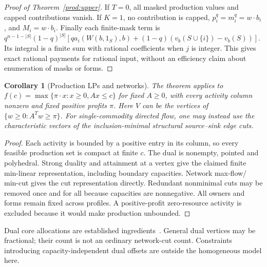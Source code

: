 \documentclass[11pt]{article}
\newtheorem{corollary}[theorem]{Corollary}
\theoremstyle{definition}\newtheorem{definition}[theorem]{Definition}
\theoremstyle{remark}\newtheorem{remark}[theorem]{Remark}
\begin{document}
\begin{proof}[Proof of Theorem~\ref{prod:upper}]
If $T=0$, all masked production values and capped contributions vanish.
If $K=1$, no contribution is capped, $p_i^q=m_i^q=w\cdot b_i$, and
$M_i=w\cdot b_i$. Finally each finite-mask term is
$q^{n-1-|S|}(1-q)^{|S|}[q a_i(W(b,1_S),b)+(1-q)(v_b(S\cup\{i\})-v_b(S))]$.
Its integral is a finite sum with rational coefficients when $j$ is integer.
This gives exact rational payments for rational input, without an efficiency
claim about enumeration of masks or forms.
\end{proof}

\begin{corollary}[Production LPs and networks]\label{prod:lp}
The theorem applies to
$f(c)=\max\{\pi\cdot x:x\ge0,Ax\le c\}$ for fixed $A\ge0$, with every
activity column nonzero and fixed positive profits $\pi$. Here $V$ can be
the vertices of $\{w\ge0:A^Tw\ge\pi\}$. For single-commodity directed flow,
one may instead use the characteristic vectors of the inclusion-minimal
structural source--sink edge cuts.
\end{corollary}
\begin{proof}
Each activity is bounded by a positive entry in its column, so every feasible
production set is compact at finite $c$. The dual is nonempty, pointed and
polyhedral. Strong duality and attainment at a vertex give the claimed finite
min-linear representation, including boundary capacities. Network max-flow/
min-cut gives the cut representation directly. Redundant nonminimal cuts may
be removed once and for all because capacities are nonnegative. All owners
and forms remain fixed across profiles. A positive-profit zero-resource
activity is excluded because it would make production unbounded.
\end{proof}
Dual core allocations are established ingredients~\citep{Owen,SametZemel}.
General dual vertices may be fractional; their count is not an ordinary
network-cut count. Constraints introducing capacity-independent dual offsets
are outside the homogeneous model here.
\end{document}
